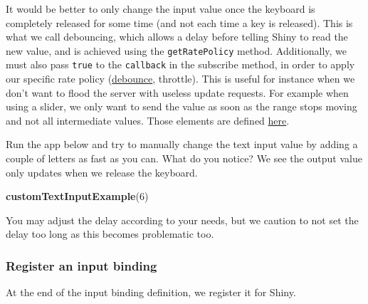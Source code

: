 \documentclass[
]{book}
\newenvironment{Shaded}{\begin{snugshade}}{\end{snugshade}}
\newcommand{\AttributeTok}[1]{\textcolor[rgb]{0.77,0.63,0.00}{#1}}
\newcommand{\CommentTok}[1]{\textcolor[rgb]{0.56,0.35,0.01}{\textit{#1}}}
\newcommand{\DecValTok}[1]{\textcolor[rgb]{0.00,0.00,0.81}{#1}}
\newcommand{\KeywordTok}[1]{\textcolor[rgb]{0.13,0.29,0.53}{\textbf{#1}}}
\newcommand{\NormalTok}[1]{#1}
\newcommand{\OperatorTok}[1]{\textcolor[rgb]{0.81,0.36,0.00}{\textbf{#1}}}
\newcommand{\StringTok}[1]{\textcolor[rgb]{0.31,0.60,0.02}{#1}}
\newcommand{\VariableTok}[1]{\textcolor[rgb]{0.00,0.00,0.00}{#1}}
\begin{document}
It would be better to only change the input value once the keyboard is completely released for some time (and not each time a key is released). This is what we call debouncing, which allows a delay before telling Shiny to read the new value, and is achieved using the \texttt{getRatePolicy} method. Additionally, we must also pass \texttt{true} to the \texttt{callback} in the subscribe method, in order to apply our specific rate policy (\href{https://davidwalsh.name/javascript-debounce-function}{debounce}, throttle). This is useful for instance when we don't want to flood the server with useless update requests. For example when using a slider, we only want to send the value as soon as the range stops moving and not all intermediate values. Those elements are defined \href{https://github.com/rstudio/shiny/blob/master/srcjs/input_rate.js}{here}.

Run the app below and try to manually change the text input value by adding a couple of letters as fast as you can. What do you notice? We see the output value only updates when we release the keyboard.

\begin{Shaded}
\begin{Highlighting}[]
\KeywordTok{customTextInputExample}\NormalTok{(}\DecValTok{6}\NormalTok{)}
\end{Highlighting}
\end{Shaded}

You may adjust the delay according to your needs, but we caution to not set the delay too long as this becomes problematic too.

\hypertarget{register-an-input-binding}{%
\subsubsection{Register an input binding}\label{register-an-input-binding}}

At the end of the input binding definition, we register it for Shiny.

\begin{Shaded}
\end{Shaded}
\end{document}
